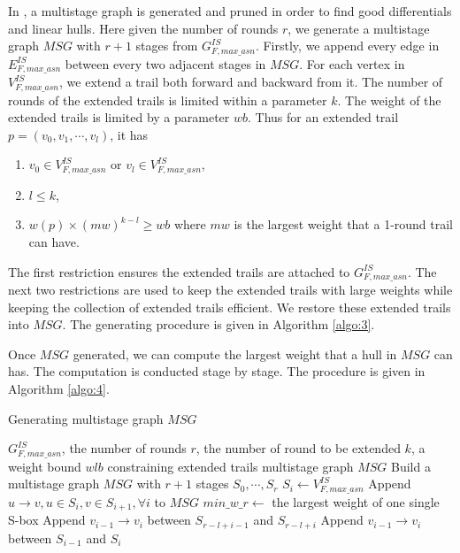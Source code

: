 In \cite{HV18}, a multistage graph is generated and pruned in order to find good differentials and linear hulls. Here given the number of rounds $r$, we generate a multistage graph $MSG$ with $r+1$ stages from $G^{IS}_{F,max\_asn}$. Firstly, we append every edge in $E^{IS}_{F,max\_asn}$ between every two adjacent stages in $MSG$. For each vertex in $V^{IS}_{F,max\_asn}$, we extend a trail both forward and backward from it. The number of rounds of the extended trails is limited within a parameter $k$. The weight of the extended trails is limited by a parameter $wb$. Thus for an extended trail $p=(v_0,v_1,\cdots,v_l)$, it has 
\begin{enumerate}
	\item $v_0\in V^{IS}_{F,max\_asn}$ or $v_l\in V^{IS}_{F,max\_asn}$,
	\item $l\leq k$,
	\item $w(p)\times (mw)^{k-l} \geq wb$ where $mw$ is the largest weight that a 1-round trail can have.
\end{enumerate}
The first restriction ensures the extended trails are attached to $G^{IS}_{F,max\_asn}$. The next two restrictions are used to keep the extended trails with large weights while keeping the collection of extended trails efficient. We restore these extended trails into $MSG$. The generating procedure is given in Algorithm \ref{algo:3}. 

Once $MSG$ generated, we can compute the largest weight that a hull in $MSG$ can has. The computation is conducted stage by stage. The procedure is given in Algorithm \ref{algo:4}.

\begin{algorithm}
	\caption{Generating multistage graph $MSG$}
	\label{algo:3}
	\begin{algorithmic}[1]
		\Require $G^{IS}_{F,max\_asn}$, the number of rounds $r$, the number of round to be extended $k$, a weight bound $wlb$ constraining extended trails
		\Ensure multistage graph $MSG$
		\Procedure {}{}
		\State Build a multistage graph $MSG$ with $r+1$ stages $S_0,\cdots,S_r$
		\State $S_i\leftarrow V^{IS}_{F,max\_asn}$
		\EndFor
		\State Append $u\rightarrow v, u\in S_i,v\in S_{i+1}, \forall i$ to $MSG$
		\EndFor
		\State $min\_w\_r\leftarrow$ the largest weight of one single S-box
		\State Append $v_{i-1}\rightarrow v_i$ between $S_{r-l+i-1}$ and $S_{r-l+i}$
		\EndFor
		\State Append $v_{i-1}\rightarrow v_i$ between $S_{i-1}$ and $S_{i}$
		\EndFor
		\EndIf
		\EndFor
		\EndProcedure
	\end{algorithmic}
\end{algorithm}

